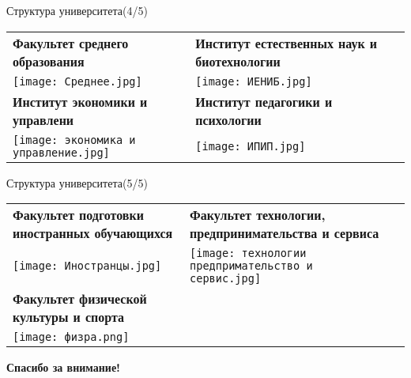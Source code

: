 \documentclass{beamer}
\begin{document}
\begin{frame}{Структура университета(4/5)}
\centering
\setlength{\tabcolsep}{10pt} %

\begin{tabular}{ >{\RaggedRight\arraybackslash}p{4.5cm} >{\centering\arraybackslash}p{4.5cm} >{\RaggedRight\arraybackslash}p{4.5cm} }
\textbf{Факультет среднего образования} & \textbf{Институт естественных наук и биотехнологии} \\
\texttt{[image: Среднее.jpg]} & \texttt{[image: ИЕНИБ.jpg]} \\
\textbf{Институт экономики и управлени} & \textbf{Институт педагогики и психологии} \\
\texttt{[image: экономика и управление.jpg]} & \texttt{[image: ИПИП.jpg]} \\

\end{tabular}
\end{frame}

\begin{frame}{Структура университета(5/5)}
\centering
\setlength{\tabcolsep}{10pt}

\begin{tabular}{ >{\RaggedRight\arraybackslash}p{4.5cm} >{\centering\arraybackslash}p{4.5cm} >{\RaggedRight\arraybackslash}p{4.5cm} }
\textbf{Факультет подготовки иностранных обучающихся} & \textbf{Факультет технологии, предпринимательства и сервиса} \\
\texttt{[image: Иностранцы.jpg]} & \texttt{[image: технологии предпримательство и сервис.jpg]} \\
\textbf{Факультет физической культуры и спорта} \\
\texttt{[image: физра.png]} \\

\end{tabular}
\end{frame}


\begin{frame}[plain]
\vfill
\begin{center}
  {\color{white}\Huge\bfseries Спасибо за внимание!}\\[1.5em]
\end{center}
\vfill
\end{frame}
\end{document}
